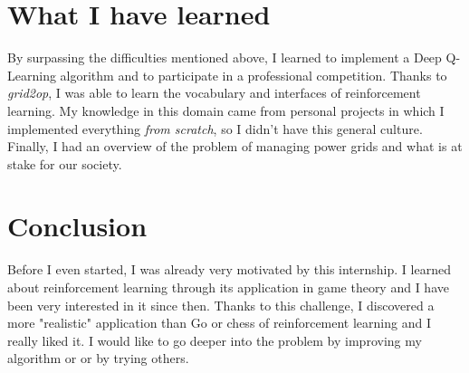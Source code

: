 \documentclass[a4paper]{article}
\begin{document}
\section{What I have learned}
By surpassing the difficulties mentioned above, I learned to implement a
Deep Q-Learning algorithm and to participate in a professional competition. Thanks to
\textit{grid2op}, I was able to learn the vocabulary and interfaces
of reinforcement learning. My knowledge in this domain came from
personal projects in which I implemented everything \textit{from scratch},
so I didn't have this general culture. Finally, I had an overview of the problem of managing
power grids and what is at stake for our society.

\section{Conclusion}
Before I even started, I was already very motivated by this internship.
I learned about reinforcement learning through its application
in game theory and I have been very interested in it since then.
Thanks to this challenge, I discovered a more "realistic" application than Go
or chess of reinforcement learning and I really liked it.
I would like to go deeper into the problem by improving my algorithm or
or by trying others.



\end{document}
